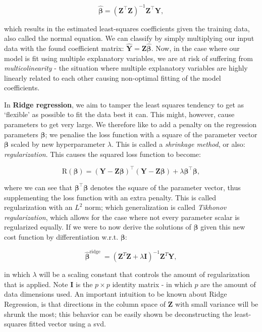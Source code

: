 \documentclass[../main.tex]{subfiles}
\begin{document}
\begin{equation}\hat{\boldsymbol{\beta}} = (\mathbf{Z}^\intercal \mathbf{Z})^{-1} \mathbf{Z}^\intercal \mathbf{Y},\end{equation}

which results in the estimated least-squares coefficients given the training data, also called the normal equation. We can classify by simply multiplying our input data with the found coefficient matrix: $\hat{\mathbf{Y}} = \mathbf{Z} \hat{\boldsymbol{\beta}}$. Now, in the case where our model is fit using multiple explanatory variables, we are at risk of suffering from \textit{multicolinearity} - the situation where multiple explanatory variables are highly linearly related to each other causing non-optimal fitting of the model coefficients.

In \textbf{Ridge regression}, we aim to tamper the least squares tendency to get as `flexible' as possible to fit the data best it can. This might, however, cause parameters to get very large. We therefore like to add a penalty on the regression parameters $\boldsymbol{\beta}$; we penalise the loss function with a square of the parameter vector $\boldsymbol{\beta}$ scaled by new hyperparameter $\lambda$. This is called a \textit{shrinkage method}, or also: \textit{regularization}. This causes the squared loss function to become:

\begin{equation}\text{R}(\boldsymbol{\beta}) = (\mathbf{Y} - \mathbf{Z} \boldsymbol{\beta})^\intercal (\mathbf{Y} - \mathbf{Z} \boldsymbol{\beta})+\lambda \boldsymbol{\beta}^\intercal \boldsymbol{\beta},\end{equation}

where we can see that $\boldsymbol{\beta}^\intercal \boldsymbol{\beta}$ denotes the square of the parameter vector, thus supplementing the loss function with an extra penalty. This is called regularization with an $L^2$ norm; which generalization is called \textit{Tikhonov regularization}, which allows for the case where not every parameter scalar is regularized equally. If we were to now derive the solutions of $\boldsymbol{\beta}$ given this new cost function by differentiation w.r.t. $\boldsymbol{\beta}$:

\begin{equation}\hat{\boldsymbol{\beta}}^{\text {ridge }}=\left(\mathbf{Z}^{T} \mathbf{Z}+\lambda \mathbf{I}\right)^{-1} \mathbf{Z}^{T} \mathbf{Y},\end{equation}

in which $\lambda$ will be a scaling constant that controls the amount of regularization that is applied. Note $\mathbf{I}$ is the $p \times p$ identity matrix - in which $p$ are the amount of data dimensions used. An important intuition to be known about Ridge Regression, is that directions in the column space of $\mathbf{Z}$ with small variance will be shrunk the most; this behavior can be easily shown be deconstructing the least-squares fitted vector using a \gls{svd}. 
\end{document}
